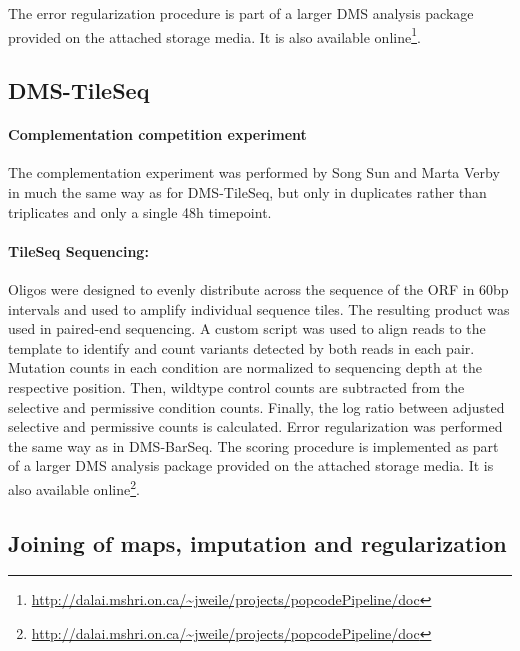 The error regularization procedure is part of a larger DMS analysis package provided on the attached storage media. It is also available online\footnote{\url{http://dalai.mshri.on.ca/~jweile/projects/popcodePipeline/doc}}.


\subsection{DMS-TileSeq}

\paragraph{Complementation competition experiment} 
The complementation experiment was performed by Song Sun and Marta Verby in much the same way as for DMS-TileSeq, but only in duplicates rather than triplicates and only a single 48h timepoint.

\paragraph{TileSeq Sequencing:} Oligos were designed to evenly distribute across the sequence of the  ORF in 60bp intervals and used to amplify individual sequence tiles. The resulting product was used in paired-end sequencing. A custom script was used to align reads to the  template to identify and count variants detected by both reads in each pair. Mutation counts in each condition are normalized to sequencing depth at the respective position. Then, wildtype control counts are subtracted from the selective and permissive condition counts. Finally, the log ratio between adjusted selective and permissive counts is calculated. Error regularization was performed the same way as in DMS-BarSeq. 
The scoring procedure is implemented as part of a larger DMS analysis package provided on the attached storage media. It is also available online\footnote{\url{http://dalai.mshri.on.ca/~jweile/projects/popcodePipeline/doc}}.

\subsection{Joining of maps, imputation and regularization}

